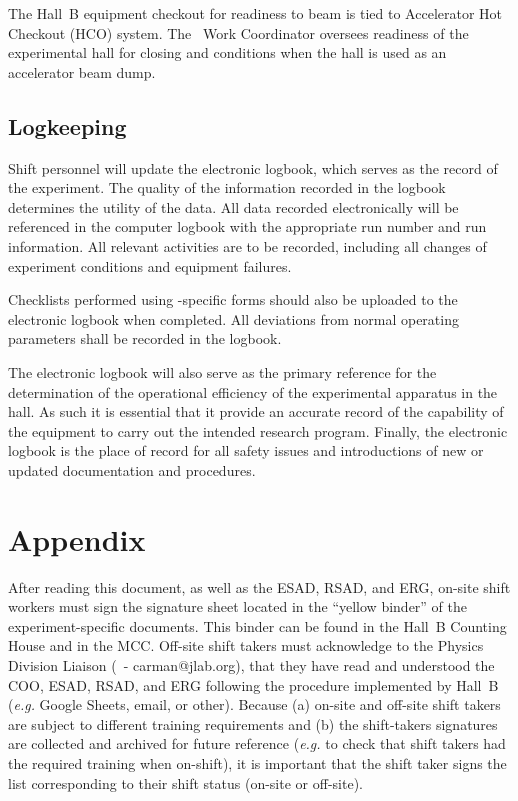 \documentclass[11pt]{article}
\begin{document}
The Hall~B equipment checkout for readiness to beam
is tied to Accelerator Hot Checkout (HCO) system. 
The \HALL\ Work Coordinator oversees readiness of the experimental hall for closing and 
conditions when the hall is used as an accelerator beam dump. 

\subsection{Logkeeping}
\indent

Shift personnel will update the electronic
logbook, which serves as the record of the experiment. 
The quality of the information recorded in the logbook 
determines the utility of the data.
All data recorded electronically
will be referenced in the  computer 
logbook with the appropriate run number and run information. All 
relevant activities are to be recorded, including 
all changes of experiment conditions and equipment failures.

Checklists performed using \HALL-specific forms should also be uploaded to the
electronic logbook when completed. All deviations from normal 
operating parameters shall be recorded in the logbook. 

The electronic logbook will also serve as the primary reference for the
determination of the operational efficiency of the experimental apparatus in
the hall. As such it is essential that it provide an accurate record of the 
capability of the equipment to carry out the intended research program. 
Finally, the electronic logbook is the place of record for all safety issues and 
introductions of new or updated documentation and procedures.

\section{Appendix}

After reading this document, as well as the ESAD, RSAD, and ERG, on-site shift workers must
sign the signature sheet located in the ``yellow binder'' of the experiment-specific documents.
This binder can be found in the Hall~B Counting House and in the MCC. Off-site shift takers must
acknowledge to the Physics Division Liaison (\PHYSDIVLIAISON \ - carman@jlab.org),
that they have read and understood the COO, ESAD, RSAD, and ERG following the procedure implemented
by Hall~B ({\it e.g.} Google Sheets, email, or other). Because (a) on-site and off-site shift takers
are subject to different training requirements and (b) the shift-takers signatures are collected and
archived for future reference ({\it e.g.} to check that shift takers had the required training when
on-shift), it is important that the shift taker signs the list corresponding to their shift status
(on-site or off-site).
\end{document}
